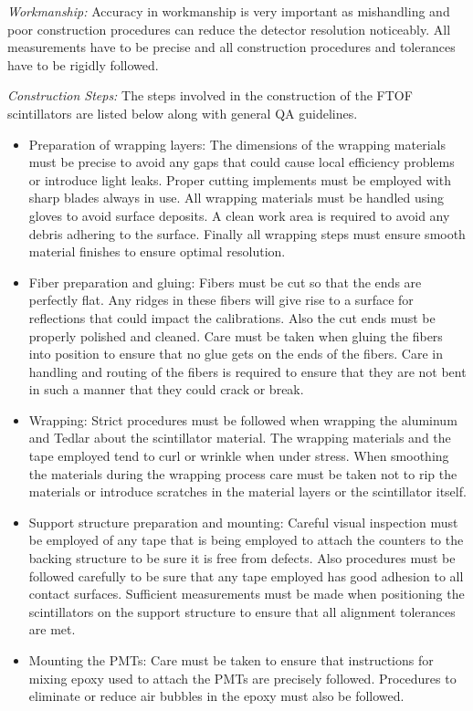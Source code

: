 \vskip 0.5cm

{\it Workmanship:} Accuracy in workmanship is very important as
mishandling and poor construction procedures can reduce the detector
resolution noticeably.  All measurements have to be precise and all
construction procedures and tolerances have to be rigidly followed.

\vskip 0.5cm

{\it Construction Steps:}  The steps involved in the construction of
the FTOF scintillators are listed below along with general QA
guidelines.

\begin{itemize}

\item Preparation of wrapping layers: The dimensions of the wrapping
materials must be precise to avoid any gaps that could cause local
efficiency problems or introduce light leaks.  Proper cutting implements
must be employed with sharp blades always in use.  All wrapping materials
must be handled using gloves to avoid surface deposits.  A clean work
area is required to avoid any debris adhering to the surface.  Finally
all wrapping steps must ensure smooth material finishes to ensure optimal 
resolution.  

\item Fiber preparation and gluing: Fibers must be cut so that the ends
are perfectly flat.  Any ridges in these fibers will give rise to a
surface for reflections that could impact the calibrations.  Also the
cut ends must be properly polished and cleaned.  Care must be taken 
when gluing the fibers into position to ensure that no glue gets on the
ends of the fibers.  Care in handling and routing of the fibers is
required to ensure that they are not bent in such a manner that they
could crack or break.

\item Wrapping: Strict procedures must be followed when wrapping the
aluminum and Tedlar about the scintillator material.  The wrapping
materials and the tape employed tend to curl or wrinkle when under
stress.  When smoothing the materials during the wrapping process care
must be taken not to rip the materials or introduce scratches in the
material layers or the scintillator itself.

\item Support structure preparation and mounting: Careful visual inspection 
must be employed of any tape that is being employed to attach the counters
to the backing structure to be sure it is free from defects.  Also
procedures must be followed carefully to be sure that any tape employed
has good adhesion to all contact surfaces.  Sufficient measurements
must be made when positioning the scintillators on the support structure
to ensure that all alignment tolerances are met.

\item Mounting the PMTs: Care must be taken to ensure that instructions 
for mixing epoxy used to attach the PMTs are precisely followed.  Procedures 
to eliminate or reduce air bubbles in the epoxy must also be followed.

\end{itemize}

